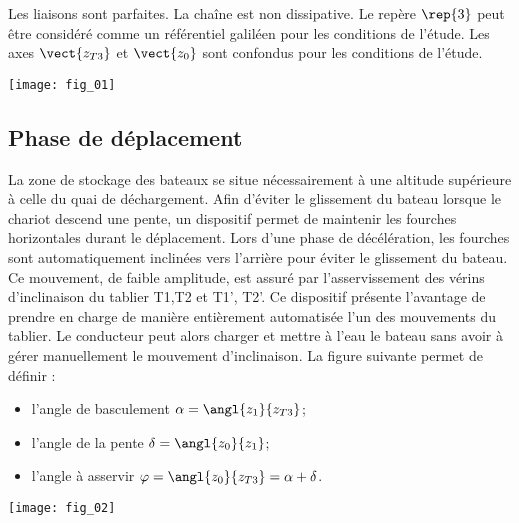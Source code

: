 \begin{multicols}{2}
Les liaisons sont parfaites. La chaîne est non dissipative. Le repère $\rep{3}$ peut être considéré comme un référentiel galiléen pour les conditions de l’étude. Les axes $\vect{z_{T3}}$ et $\vect{z_{0}}$ sont confondus pour les conditions de l’étude.

\begin{center}
\texttt{[image: fig\_01]}
\end{center}

\ifprof
\begin{corrige}
\end{corrige}
\else
\fi



\subsection*{Phase de déplacement}
La zone de stockage des bateaux se situe nécessairement à une altitude supérieure à celle du quai de déchargement. Afin d’éviter le glissement du bateau lorsque le chariot descend une pente, un dispositif permet de maintenir les fourches horizontales durant le déplacement. Lors d’une phase de décélération, les fourches sont automatiquement inclinées vers l’arrière pour éviter le glissement du bateau. Ce mouvement, de faible amplitude, est assuré par l’asservissement des vérins d’inclinaison du tablier T1,T2 et T1’, T2’. Ce dispositif présente l’avantage de prendre en charge de manière entièrement automatisée l’un des mouvements du tablier. Le conducteur peut alors charger et mettre à l’eau le bateau sans avoir à gérer manuellement le mouvement d’inclinaison.
La figure suivante permet de définir :
\begin{itemize}
\item l'angle de basculement $\alpha=\angl{z_1}{z_{T3}}$;
\item l'angle de la pente $\delta=\angl{z_0}{z_1}$;
\item l'angle à asservir  $\varphi=\angl{z_0}{z_{T3}}=\alpha+\delta$.
\end{itemize}


\begin{center}
\texttt{[image: fig\_02]}
\end{center}


\ifprof
\begin{corrige}
\end{corrige}
\else
\fi




\end{multicols}
